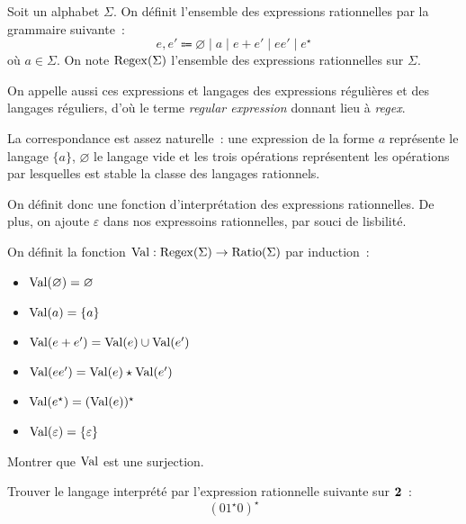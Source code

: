 \begin{definition}
  Soit un alphabet $\Sigma$. On définit l'ensemble des expressions rationnelles
  par la grammaire suivante~:
  \[e,e' \Coloneq \varnothing\mid a \mid e + e' \mid e e' \mid e^\star\]
  où $a \in \Sigma$. On note $\operatorname{Regex}(\Sigma)$ l'ensemble des expressions
  rationnelles sur $\Sigma$.
\end{definition}

\begin{remark}
  On appelle aussi ces expressions et langages des expressions régulières et des
  langages réguliers, d'où le terme \textit{regular expression} donnant lieu à
  \textit{regex}.
\end{remark}

La correspondance est assez naturelle~: une expression de la forme $a$
représente le langage $\{a\}$, $\varnothing$ le langage vide et les trois
opérations représentent les opérations par lesquelles est stable la classe des
langages rationnels.

On définit donc une fonction d'interprétation des expressions rationnelles. De
plus, on ajoute $\varepsilon$ dans nos expressoins rationnelles, par souci de
lisbilité.

\begin{definition}
  On définit la fonction $\operatorname{Val} : \operatorname{Regex}(\Sigma)\to\operatorname{Ratio}(\Sigma)$ par
  induction~:
  \begin{itemize}
  \item $\operatorname{Val}(\varnothing) = \varnothing$
  \item $\operatorname{Val}(a) = \{a\}$
  \item $\operatorname{Val}(e+e') = \operatorname{Val}(e) \cup \operatorname{Val}(e')$
  \item $\operatorname{Val}(ee') = \operatorname{Val}(e) \star \operatorname{Val}(e')$
  \item $\operatorname{Val}(e^\star) = (\operatorname{Val}(e))^\star$
  \item $\operatorname{Val}(\varepsilon) = \{\varepsilon\}$
  \end{itemize}
\end{definition}

\begin{exercise}
  Montrer que $\operatorname{Val}$ est une surjection.
\end{exercise}

\begin{exercise}
  Trouver le langage interprété par l'expression rationnelle suivante sur
  $\boldsymbol{2}$~:
  \[(01^\star 0)^\star\]
\end{exercise}

